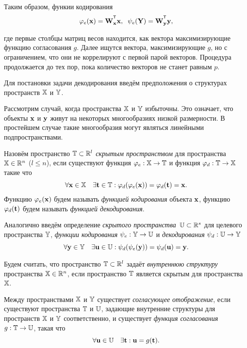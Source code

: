 Таким образом, функии кодирования
\begin{equation}
	\varphi_e(\bx) = \bW_{\bx}^{\T}\bx , \;\;
	\psi_e(\bY) = \bW_{\by}^{\T}\by ,
\end{equation}

где первые столбцы матриц весов находится, как вектора максимизирующие функцию согласования $g$. Далее ищутся вектора, максимизирующие $g$, но с ограничением, что они не коррелируют с первой парой векторов. Процедура продолжается до тех пор, пока количество векторов не станет равным $p$. 
 
\hrulefill
 
Для постановки задачи декодирования введём предположения о структурах пространств $\mathbb{X}$ и $\mathbb{Y}$.
\begin{assumption}
	Рассмотрим случай, когда пространства $\mathbb{X}$ и $\mathbb{Y}$ избыточны. Это означает, что объекты $\mathbf{x}$ и $\mathbf{y}$ живут на некоторых многообразиях низкой размерности. В простейшем случае такие многообразия могут являться линейными подпространствами.
\end{assumption}

\begin{definition}
	Назовём пространство $\mathbb{T} \subset \mathbb{R}^l$ \textit{скрытым пространством} для пространства $\mathbb{X} \in \mathbb{R}^n$ ($l \leq n$), если существуют функция $\varphi_e: \mathbb{X} \to \mathbb{T}$ и функция $\varphi_d: \mathbb{T}  \to \mathbb{X}$ такие что
	\[
		\forall \mathbf{x} \in \mathbb{X} \quad \exists \mathbf{t} \in \mathbb{T}: \varphi_d (\varphi_e(\mathbf{x})) = \varphi_d(\mathbf{t}) = \mathbf{x}.
	\]
	Функцию $\varphi_e(\mathbf{x})$ будем называть \textit{функцией кодирования} объекта $\mathbf{x}$, функцию $\varphi_d(\mathbf{t})$ будем называть \textit{функцией декодирования}. 
	
	
	Аналогично введём определение \textit{скрытого пространства}~$\mathbb{U} \subset \mathbb{R}^s$ для целевого пространства $\mathbb{Y}$, \textit{функции кодирования} $\psi_e: \mathbb{Y} \to \mathbb{U}$ и \textit{декодирования} $\psi_d: \mathbb{U}  \to \mathbb{Y}$
	\[
	\forall \mathbf{y} \in \mathbb{Y} \quad  \exists \mathbf{u} \in \mathbb{U}: \psi_d (\psi_e(\mathbf{y})) = \psi_d(\mathbf{u}) = \mathbf{y}.
	\]
\end{definition}

\begin{definition}
	Будем считать, что пространство $\mathbb{T} \subset \mathbb{R}^l$ задаёт \textit{внутреннюю структуру} пространства $\mathbb{X} \in \mathbb{R}^n$, если пространство $\mathbb{T}$ является скрытым для пространства $\mathbb{X}$.
\end{definition}

\begin{definition}
	Между пространствами $\mathbb{X}$ и $\mathbb{Y}$ существует \textit{согласующее отображение}, если существуют пространства $\mathbb{T}$ и $\mathbb{U}$, задающие внутренние структуры для пространств $\mathbb{X}$ и $\mathbb{Y}$ соответственно, и существует \textit{функция согласования} $g: \mathbb{T} \rightarrow \mathbb{U}$, такая что
	\[
	 \forall \mathbf{u} \in \mathbb{U} \quad \exists \mathbf{t}:  \mathbf{u} = g(\mathbf{t}).
	\]
\end{definition}

